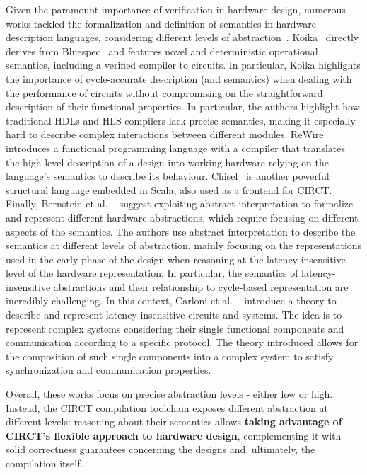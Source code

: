 \documentclass[sigconf,authorversion,nonacm, 11pt]{acmart}
\begin{document}
Given the paramount importance of verification in hardware design, numerous works tackled the formalization and definition of 
semantics in hardware description languages, considering different levels of abstraction~\cite{melham1988abstraction}. 
Koika~\cite{bourgeat2020essence} directly derives from Bluespec~\cite{bluespec} and features novel and deterministic operational semantics, 
including a verified compiler to circuits. In particular, Koika highlights the importance of cycle-accurate description (and semantics) 
when dealing with the performance of circuits without compromising on the straightforward description of their functional properties. 
In particular, the authors highlight how traditional HDLs and HLS compilers lack precise semantics, making it especially hard to 
describe complex interactions between different modules.
ReWire~\cite{procter2015semantics} introduces a functional programming language with a compiler that translates the high-level 
description of a design into working hardware relying on the language's semantics to describe its behaviour.
Chisel~\cite{bachrach2012chisel} is another powerful structural language embedded in Scala, also used as a frontend for CIRCT. 
Finally, Bernstein et al. ~\cite{bernstein2021semantics} suggest exploiting abstract interpretation to formalize and represent 
different hardware abstractions, which require focusing on different aspects of the semantics. 
The authors use abstract interpretation to describe the semantics at different levels of abstraction, 
mainly focusing on the representations used in the early phase of the design when reasoning at the latency-insensitive level of the hardware representation.
In particular, the semantics of latency-insensitive abstractions and their relationship to cycle-based representation are incredibly challenging. 
In this context, Carloni et al. ~\cite{carloni2001theory} introduce a theory to describe and represent latency-insensitive circuits and systems. 
The idea is to represent complex systems considering their single functional components and communication according to a specific protocol. 
The theory introduced allows for the composition of such single components into a complex system to satisfy synchronization and communication properties. 

Overall, these works focus on precise abstraction levels - either low or high. 
Instead, the CIRCT compilation toolchain exposes different abstraction at different levels: 
reasoning about their semantics allows \textbf{taking advantage of CIRCT’s flexible approach to hardware design}, complementing it with solid correctness 
guarantees concerning the designs and, ultimately, the compilation itself.
\end{document}
